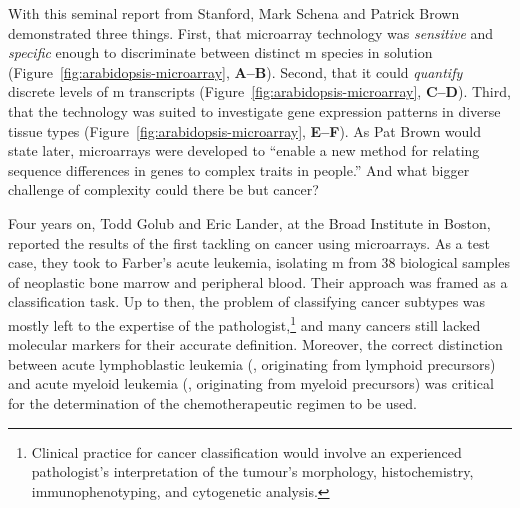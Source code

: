 With this seminal report from Stanford, Mark Schena and Patrick Brown
demonstrated three things.  First, that microarray technology was
\emph{sensitive} and \emph{specific} enough to discriminate between distinct
m species in solution (Figure~\ref{fig:arabidopsis-microarray},
\textbf{A--B}).  Second, that it could \emph{quantify} discrete levels of
m transcripts (Figure~\ref{fig:arabidopsis-microarray},
\textbf{C--D}).  Third, that the technology was suited to investigate gene
expression patterns in diverse tissue types
(Figure~\ref{fig:arabidopsis-microarray}, \textbf{E--F}).  As Pat Brown would
state later, microarrays were developed to ``enable a new method for relating
sequence differences in genes to complex traits in people.''  And what bigger
challenge of complexity could there be but cancer?

Four years on, Todd Golub and Eric Lander, at the Broad Institute in Boston,
reported the results of the first tackling on cancer using
microarrays.\cite{golub_molecular_1999} As a test case, they took to Farber's
acute leukemia, isolating m from 38 biological samples of
neoplastic bone marrow and peripheral blood. Their approach was framed as a
classification task.  Up to then, the problem of classifying cancer subtypes was
mostly left to the expertise of the pathologist,\footnote{Clinical practice for
  cancer classification would involve an experienced pathologist's
  interpretation of the tumour's morphology, histochemistry, immunophenotyping,
  and cytogenetic analysis.} and many cancers still lacked molecular markers for
their accurate definition.  Moreover, the correct distinction between acute
lymphoblastic leukemia (, originating from lymphoid precursors)
and acute myeloid leukemia (, originating from myeloid
precursors) was critical for the determination of the chemotherapeutic regimen
to be used.

